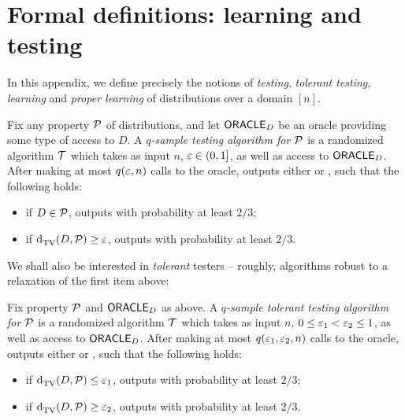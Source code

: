 \section{Formal definitions: learning and testing}\label{appendix:definitions}
In this appendix, we define precisely the notions of \emph{testing}, \emph{tolerant testing}, \emph{learning} and \emph{proper learning} of distributions over a domain $[n]$.
\begin{definition}[Testing]\label{def:testing:alg}
  Fix any property $\mathcal{P}$ of distributions, and let ${\sf ORACLE}_{D}$ be an oracle providing some type of access to $D$. A \emph{$q$-sample testing algorithm for $\mathcal{P}$} is a randomized algorithm $\mathcal{T}$ which takes as input $n$, $\varepsilon\in(0,1]$, as well as access to ${\sf ORACLE}_{D}$. After making at most $q(\varepsilon,n)$ calls to the oracle, \Tester outputs either \accept or \reject, such that the following holds:
  \begin{itemize}
    \item if $D\in\mathcal{P}$, \Tester outputs \accept with probability at least $2/3$;
    \item if ${\operatorname{d}_{\textrm{TV}}^{}\!\left({D, \mathcal{P}}\right)} \geq \varepsilon$, \Tester outputs \reject with probability at least $2/3$.
  \end{itemize}
\end{definition}
\noindent We shall also be interested in \emph{tolerant} testers -- {roughly}, algorithms robust to a relaxation of the first item above:
\begin{definition}\label{def:tol:testing:alg}
  Fix property $\mathcal{P}$ and ${\sf ORACLE}_{D}$ as above. A \emph{$q$-sample tolerant testing algorithm for $\mathcal{P}$} is a randomized algorithm $\mathcal{T}$ which takes as input $n$, $0 \leq \varepsilon_1 < \varepsilon_2 \leq 1$, as well as access to ${\sf ORACLE}_{D}$. After making at most $q(\varepsilon_1,\varepsilon_2,n)$ calls to the oracle, \Tester outputs either \accept or \reject, such that the following holds:
  \begin{itemize}
    \item if ${\operatorname{d}_{\textrm{TV}}^{}\!\left({D, \mathcal{P}}\right)} \leq \varepsilon_1$, \Tester outputs \accept with probability at least $2/3$;
    \item if ${\operatorname{d}_{\textrm{TV}}^{}\!\left({D, \mathcal{P}}\right)} \geq \varepsilon_2$, \Tester outputs \reject with probability at least $2/3$.
  \end{itemize}
\end{definition}

